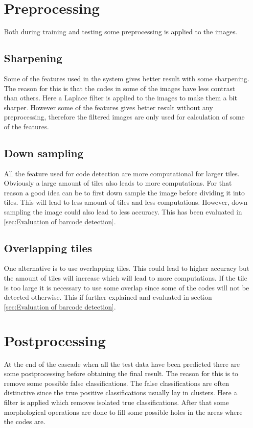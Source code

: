 \section{Preprocessing}
\label{Preprocessing}
Both during training and testing some preprocessing is applied to the images.

\subsection{Sharpening}
Some of the features used in the system gives better result with some sharpening. The reason for this is that the codes in some of the images have less contrast than others. Here a Laplace filter is applied to the images to make them a bit sharper. However some of the features gives better result without any preprocessing, therefore the filtered images are only used for calculation of some of the features.

\subsection{Down sampling}
All the feature used for code detection are more computational for larger tiles. Obviously a large amount of tiles also leads to more computations. For that reason a good idea can be to first down sample the image before dividing it into tiles. This will lead to less amount of tiles and less computations. However, down sampling the image could also lead to less accuracy. This has been evaluated in \ref{sec:Evaluation of barcode detection}.

\subsection{Overlapping tiles}
One alternative is to use overlapping tiles. This could lead to higher accuracy but the amount of tiles will increase which will lead to more computations. If the tile is too large it is necessary to use some overlap since some of the codes will not be detected otherwise. This if further explained and evaluated in section \ref{sec:Evaluation of barcode detection}.

\section{Postprocessing}
\label{Postprocessing}
At the end of the cascade when all the test data have been predicted there are some postprocessing before obtaining the final result. The reason for this is to remove some possible false classifications. The false classifications are often distinctive since the true positive classifications usually lay in clusters. Here a filter is applied which removes isolated true classifications. After that some morphological operations are done to fill some possible holes in the areas where the codes are.

